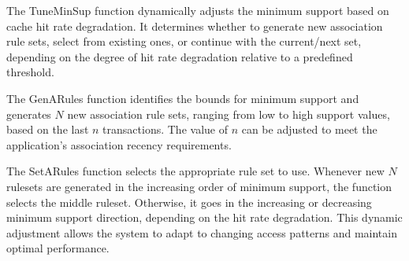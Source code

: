             The TuneMinSup function dynamically adjusts the minimum support based on cache hit rate degradation. It determines whether to generate new association rule sets, select from existing ones, or continue with the current/next set, depending on the degree of hit rate degradation relative to a predefined threshold.

            The GenARules function identifies the bounds for minimum support and generates $N$ new association rule sets, ranging from low to high support values, based on the last $n$ transactions. The value of $n$ can be adjusted to meet the application's association recency requirements.
        
            The SetARules function selects the appropriate rule set to use. Whenever new $N$ rulesets are generated in the increasing order of minimum support, the function selects the middle ruleset. Otherwise, it goes in the increasing or decreasing minimum support direction, depending on the hit rate degradation. This dynamic adjustment allows the system to adapt to changing access patterns and maintain optimal performance.
        
